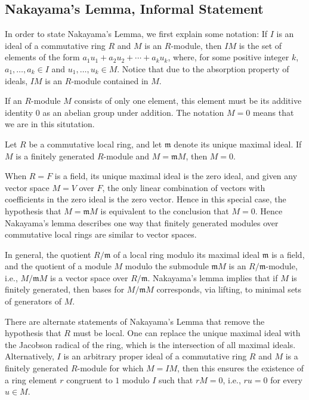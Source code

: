 \documentclass{article}
\begin{document}
\subsection{Nakayama's Lemma, Informal Statement}

In order to state Nakayama's Lemma, we first explain some notation:  If $I$ is an ideal of a commutative ring $R$ and 
 $M$ is an $R$-module, then $IM$ is the set of elements of the form 
	$a_1 u_1 + a_2 u_2 + \cdots + a_k u_k$, where, for some positive integer $k$, $a_1, \ldots, a_k \in I$ and $u_1, \ldots, u_k \in M$.  
Notice that due to the absorption property of ideals, $IM$ is an $R$-module contained in $M$. 	

If an $R$-module $M$ consists of only one element, this element must be its additive identity $0$ as an abelian group under addition.  The notation $M=0$ means that we are in this situtation. 

\begin{nak*}
Let $R$ be a commutative local ring, and let $\mathfrak{m}$ denote its unique maximal ideal. 
If $M$ is a finitely generated $R$-module and $M = \mathfrak{m} M$, then $M = 0$. 
\end{nak*}

When $R=F$ is a field, its unique maximal ideal is the zero ideal, and given any vector space $M=V$ over $F$, the only linear combination of vectors with coefficients in the zero ideal is the zero vector. Hence in this special case, the hypothesis that  $M = \mathfrak{m} M$ is equivalent to the conclusion that $M=0$. 
Hence Nakayama's lemma describes one way that finitely generated modules over commutative local rings are similar to vector spaces. 

In general, the quotient $R/\mathfrak{m}$ of a local ring modulo its maximal ideal $\mathfrak{m}$ is a field, and the quotient of a module $M$ modulo the submodule $\mathfrak{m}M$ is an $R/\mathfrak{m}$-module, i.e., $M/\mathfrak{m}M$ is a vector space over $R/\mathfrak{m}$. Nakayama's lemma implies that if $M$ is finitely generated, then bases for $M/\mathfrak{m}M$ corresponds, via lifting, to minimal sets of generators of 
$M$. 

There are alternate statements of Nakayama's Lemma that remove the hypothesis that $R$ must be local.  One can replace the unique maximal ideal with the Jacobson radical of the ring, which is the intersection of all maximal ideals. Alternatively, $I$ is an arbitrary proper ideal of a commutative ring $R$ and  
 $M$ is a finitely generated $R$-module for which $M=I M$, then this ensures the existence of a ring element $r$ congruent to $1$ modulo $I$ such that $rM = 0$, i.e., $r u = 0$ for every $u \in M$. 
\end{document}
